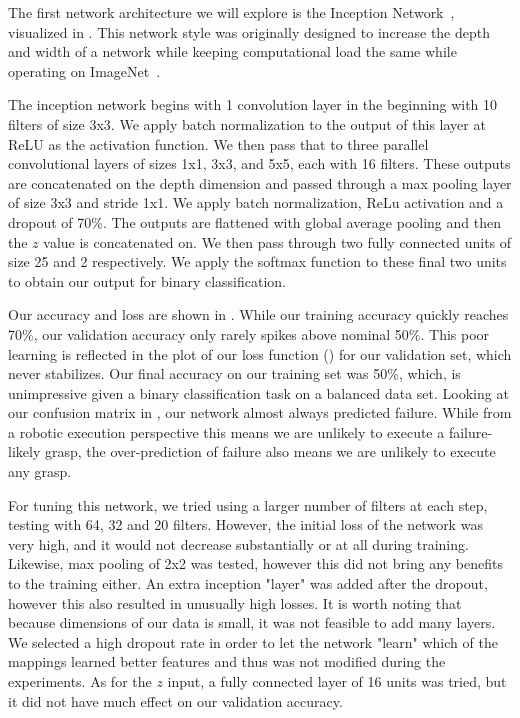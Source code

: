 The first network architecture we will explore is the Inception Network~\cite{szegedy2015going}, visualized in . 
This network style was originally designed to increase the depth and width of a network while keeping computational load the same while operating on ImageNet~\cite{deng2009imagenet}. 

The inception network begins with 1 convolution layer in the beginning with 10 filters of size 3x3. 
We apply batch normalization to the output of this layer at ReLU as the activation function. 
We then pass that to three parallel convolutional layers of sizes 1x1, 3x3, and 5x5, each with 16 filters. 
These outputs are concatenated on the depth dimension and passed through a max pooling layer of size 3x3 and stride 1x1.
We apply batch normalization, ReLu activation and a dropout of 70\%. 
The outputs are flattened with global average pooling and then the $z$ value is concatenated on. 
We then pass through two fully connected units of size 25 and 2 respectively.  
We apply the softmax function to these final two units to obtain our output for binary classification.

Our accuracy and loss are shown in . 
While our training accuracy quickly reaches 70\%, our validation accuracy only rarely spikes above nominal 50\%. 
This poor learning is reflected in the plot of our loss function () for our validation set, which never stabilizes. 
Our final accuracy on our training set was 50\%, which, is unimpressive given a binary classification task on a balanced data set. 
Looking at our confusion matrix in , our network almost always predicted failure. 
While from a robotic execution perspective this means we are unlikely to execute a failure-likely grasp, the over-prediction of failure also means we are unlikely to execute any grasp. 

For tuning this network, we tried using a larger number of filters at each step, testing with 64, 32 and 20 filters. 
However, the initial loss of the network was very high, and it would not decrease substantially or at all during training. Likewise, max pooling of 2x2 was tested, however this did not bring any benefits to the training either. 
An extra inception "layer" was added after the dropout, however this also resulted in unusually high losses. 
It is worth noting that because dimensions of our data is small, it was not feasible to add many layers. 
We selected a high dropout rate in order to let the network "learn" which of the mappings learned better features and thus was not modified during the experiments. 
As for the $z$ input, a fully connected layer of 16 units was tried, but it did not have much effect on our validation accuracy. 



